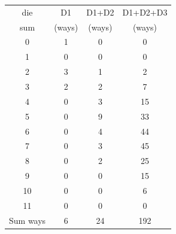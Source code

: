 \documentclass[12pt]{article}
\begin{document}
\begin{enumerate}
\begin{enumerate}
    \end{enumerate}
    \begin{center}
        \begin{tabular}{|c|c|c|c|}
        \hline
            die  &  D1 & D1+D2 & D1+D2+D3 \\
            sum    & (ways)&(ways) &(ways) \\
            \hline
            0 & 1 & 0 & 0\\
            \hline
            1  & 0 & 0& 0\\
            \hline
            2  & 3 & 1& 2\\
            \hline
            3  & 2& 2& 7\\
            \hline
            4  & 0& 3& 15\\
            \hline
            5  & 0& 9& 33\\
            \hline
            6  & 0& 4& 44\\
            \hline
            7  & 0& 3& 45\\
            \hline
            8  & 0& 2& 25\\
            \hline
            9  & 0& 0& 15\\
            \hline
            10  &0 & 0& 6\\
            \hline
            11 & 0 & 0 & 0\\
            \hline
            Sum ways & 6 & 24 & 192 \\ 
            \hline
            

\end{tabular}
\end{center}
\end{enumerate}
\end{document}
